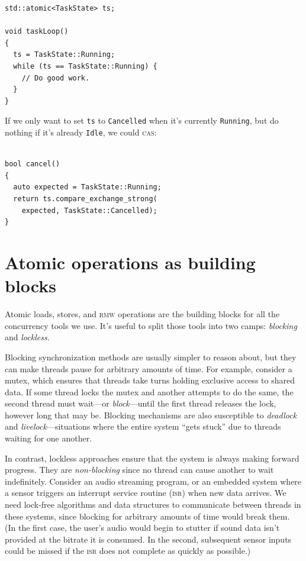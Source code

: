 \documentclass[fontsize=10pt, numbers=endperiod]{scrartcl}
\newcommand{\codesize}{\fontsize{10pt}{12pt}}
\newcommand{\introduce}[1]{\textit{#1}}
\newenvironment{colfigure}
  {\par\vspace{1\baselineskip minus 0.5\baselineskip}\noindent\minipage{\linewidth}}
  {\endminipage\vspace*{1\baselineskip minus 0.7\baselineskip}}
\begin{document}
\begin{multicols*}{2}
\begin{colfigure}
\begin{verbatim}
std::atomic<TaskState> ts;

void taskLoop()
{
  ts = TaskState::Running;
  while (ts == TaskState::Running) {
    // Do good work.
  }
}
\end{verbatim}
\end{colfigure}
If we only want to set \texttt{ts} to \texttt{Cancelled} when it's
currently \texttt{Running}, but do nothing if it's already \texttt{Idle},
we could \textsc{cas}:
\begin{colfigure}
\begin{verbatim}

bool cancel()
{
  auto expected = TaskState::Running;
  return ts.compare_exchange_strong(
    expected, TaskState::Cancelled);
}
\end{verbatim}
\end{colfigure}

\section{Atomic operations as building blocks}

Atomic loads, stores, and \textsc{rmw} operations are the building
blocks for all the concurrency tools we use.
It's useful to split those tools into two camps:
\introduce{blocking} and \introduce{lockless}.

Blocking synchronization methods are usually simpler to reason about,
but they can make threads pause for arbitrary amounts of time.
For example, consider a mutex,
which ensures that threads take turns holding exclusive access to shared data.
If some thread locks the mutex
and another attempts to do the same,
the second thread must wait---or \introduce{block}---until
the first thread releases the lock,
however long that may be.
Blocking mechanisms are also susceptible to \introduce{deadlock} and
\introduce{livelock}---situations where the entire system ``gets stuck''
due to threads waiting for one another.

In contrast, lockless approaches
ensure that the system is always making forward progress.
They are \introduce{non-blocking} since no thread can cause another to wait
indefinitely.
Consider an audio streaming program,
or an embedded system where a sensor triggers an interrupt service routine
\textsc{(isr)} when new data arrives.
We need lock-free algorithms and data structures to communicate
between threads in these systems,
since blocking for arbitrary amounts of time would break them.
(In the first case, the user's audio would begin to stutter if sound data
isn't provided at the bitrate it is consumed.
In the second, subsequent sensor inputs could be missed if the \textsc{isr}
does not complete as quickly as possible.)


\end{multicols*}
\end{document}
